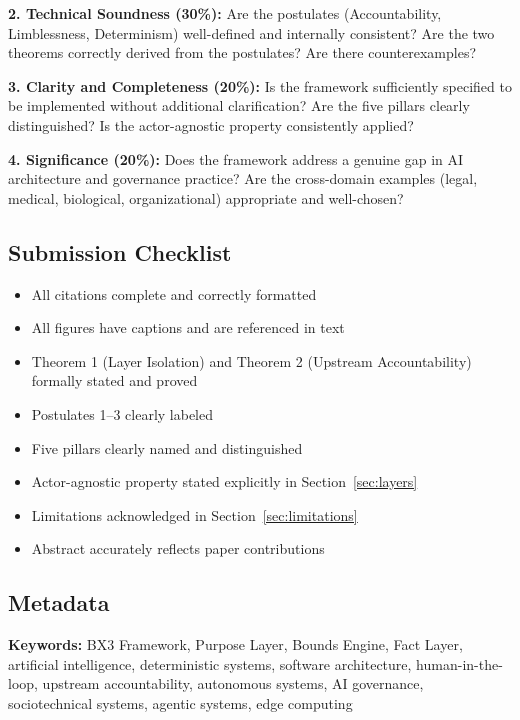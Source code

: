 \documentclass[12pt]{article}
\begin{document}
\textbf{2. Technical Soundness (30\%):} Are the postulates (Accountability, Limblessness, Determinism) well-defined and internally consistent? Are the two theorems correctly derived from the postulates? Are there counterexamples?

\textbf{3. Clarity and Completeness (20\%):} Is the framework sufficiently specified to be implemented without additional clarification? Are the five pillars clearly distinguished? Is the actor-agnostic property consistently applied?

\textbf{4. Significance (20\%):} Does the framework address a genuine gap in AI architecture and governance practice? Are the cross-domain examples (legal, medical, biological, organizational) appropriate and well-chosen?

\subsection*{Submission Checklist}

\begin{itemize}
    \item[ ] All citations complete and correctly formatted
    \item[ ] All figures have captions and are referenced in text
    \item[ ] Theorem 1 (Layer Isolation) and Theorem 2 (Upstream Accountability) formally stated and proved
    \item[ ] Postulates 1--3 clearly labeled
    \item[ ] Five pillars clearly named and distinguished
    \item[ ] Actor-agnostic property stated explicitly in Section~\ref{sec:layers}
    \item[ ] Limitations acknowledged in Section~\ref{sec:limitations}
    \item[ ] Abstract accurately reflects paper contributions
\end{itemize}

\subsection*{Metadata}

\textbf{Keywords:} BX3 Framework, Purpose Layer, Bounds Engine, Fact Layer, artificial intelligence, deterministic systems, software architecture, human-in-the-loop, upstream accountability, autonomous systems, AI governance, sociotechnical systems, agentic systems, edge computing
\end{document}
